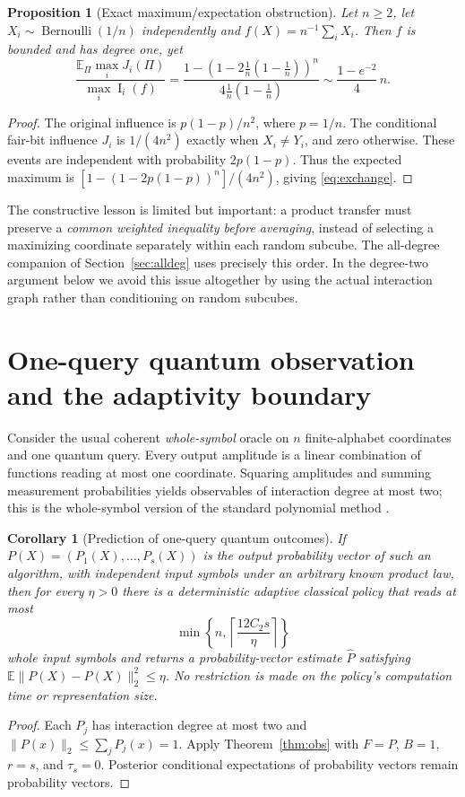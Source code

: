 \documentclass[11pt,letterpaper]{article}
\newtheorem{proposition}[theorem]{Proposition}
\newtheorem{corollary}[theorem]{Corollary}
\theoremstyle{definition}\newtheorem{definition}[theorem]{Definition}
\newcommand{\E}{\mathbb E}
\newcommand{\Inf}{\operatorname{I}}
\newcommand{\Ctwo}{C_2}
\newcommand{\norm}[1]{\lVert #1\rVert}
\begin{document}
\begin{proposition}[Exact maximum/expectation obstruction]\label{prop:exchange}
Let $n\ge2$, let $X_i\sim\operatorname{Bernoulli}(1/n)$ independently and $f(X)=n^{-1}\sum_i X_i$. Then $f$ is bounded and has degree one, yet
\begin{equation}\label{eq:exchange}
\frac{\E_\Pi\max_i J_i(\Pi)}{\max_i\Inf_i(f)}
=\frac{1-\left(1-2\frac1n(1-\frac1n)\right)^n}{4\frac1n(1-\frac1n)}
\sim\frac{1-e^{-2}}4\,n.
\end{equation}
\end{proposition}
\begin{proof}
The original influence is $p(1-p)/n^2$, where $p=1/n$. The conditional fair-bit influence $J_i$ is $1/(4n^2)$ exactly when $X_i\ne Y_i$, and zero otherwise. These events are independent with probability $2p(1-p)$. Thus the expected maximum is $[1-(1-2p(1-p))^n]/(4n^2)$, giving \eqref{eq:exchange}.
\end{proof}
The constructive lesson is limited but important: a product transfer must preserve a \emph{common weighted inequality before averaging}, instead of selecting a maximizing coordinate separately within each random subcube. The all-degree companion of Section~\ref{sec:alldeg} uses precisely this order. In the degree-two argument below we avoid this issue altogether by using the actual interaction graph rather than conditioning on random subcubes.


\section{One-query quantum observation and the adaptivity boundary}\label{sec:quantum}
Consider the usual coherent \emph{whole-symbol} oracle on $n$ finite-alphabet coordinates and one quantum query. Every output amplitude is a linear combination of functions reading at most one coordinate. Squaring amplitudes and summing measurement probabilities yields observables of interaction degree at most two; this is the whole-symbol version of the standard polynomial method \cite{BBCMW2001}.

\begin{corollary}[Prediction of one-query quantum outcomes]\label{cor:quantum}
If $P(X)=(P_1(X),\ldots,P_s(X))$ is the output probability vector of such an algorithm, with independent input symbols under an arbitrary known product law, then for every $\eta>0$ there is a deterministic adaptive classical policy that reads at most
\[
\min\left\{n,\left\lceil\frac{12\Ctwo s}{\eta}\right\rceil\right\}
\]
whole input symbols and returns a probability-vector estimate $\widehat P$ satisfying $\E\norm{P(X)-\widehat P(X)}_2^2\le\eta$. No restriction is made on the policy's computation time or representation size.
\end{corollary}
\begin{proof}
Each $P_j$ has interaction degree at most two and $\norm{P(x)}_2\le\sum_jP_j(x)=1$. Apply Theorem~\ref{thm:obs} with $F=P$, $B=1$, $r=s$, and $\tau_s=0$. Posterior conditional expectations of probability vectors remain probability vectors.
\end{proof}
\end{document}
